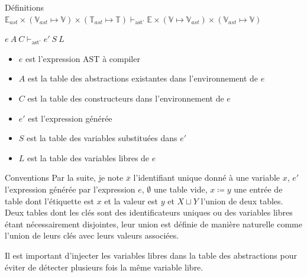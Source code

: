 \documentclass{beamer}
\begin{document}
\begin{frame}{Définitions}
    $\mathbb{E}_{ast} \times \left( \mathbb{V}_{ast} \mapsto \mathbb{V} \right) \times \left( \mathbb{T}_{ast} \mapsto \mathbb{T} \right) \vdash_{\text{ast'}} \mathbb{E} \times \left( \mathbb{V} \mapsto \mathbb{V}_{ast} \right) \times \left( \mathbb{V}_{ast} \mapsto \mathbb{V} \right)$

    $e ~ A ~ C \vdash_{\text{ast'}} e' ~ S ~ L$
    \begin{itemize}
        \item $e$ est l'expression AST à compiler
        \item $A$ est la table des abstractions existantes dans l'environnement de $e$
        \item $C$ est la table des constructeurs dans l'environnement de $e$
        \item $e'$ est l'expression générée
        \item $S$ est la table des variables substituées dans $e'$
        \item $L$ est la table des variables libres de $e$
    \end{itemize}
\end{frame}

\begin{frame}{Conventions}
    Par la suite, je note $\overline{x}$ l'identifiant unique donné à une variable $x$, $e'$ l'expression générée par l'expression $e$, $\emptyset$ une table vide, $x \coloneqq y$ une entrée de table dont l'étiquette est $x$ et la valeur est $y$ et $X \sqcup Y$ l'union de deux tables. Deux tables dont les clés sont des identificateurs uniques ou des variables libres étant nécessairement disjointes, leur union est définie de manière naturelle comme l'union de leurs clés avec leurs valeurs associées.

    Il est important d'injecter les variables libres dans la table des abstractions pour éviter de détecter plusieurs fois la même variable libre.
\end{frame}
\end{document}
